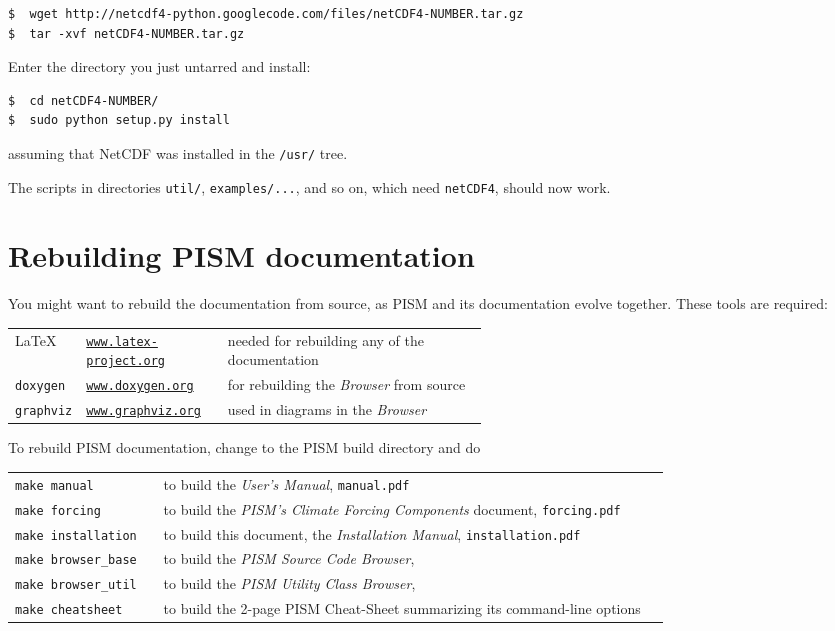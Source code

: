\documentclass[titlepage,letterpaper,final]{scrartcl}
\begin{document}
\begin{verbatim}
$  wget http://netcdf4-python.googlecode.com/files/netCDF4-NUMBER.tar.gz
$  tar -xvf netCDF4-NUMBER.tar.gz
\end{verbatim}
Enter the directory you just untarred and install:
\begin{verbatim}
$  cd netCDF4-NUMBER/
$  sudo python setup.py install
\end{verbatim}
assuming that NetCDF was installed in the \texttt{/usr/} tree.

The scripts in directories \texttt{util/}, \texttt{examples/...}, and so on,
which need \texttt{netCDF4}, should now work.

\section{Rebuilding PISM documentation}
\label{sec:docs}

You might want to rebuild the documentation from source, as PISM and its
documentation evolve together. These tools are required: \bigskip
\begin{center}
  \begin{tabular*}{0.9\linewidth}{llp{0.55\linewidth}}
    \toprule
    \LaTeX & \href{http://www.latex-project.org/}{\texttt{www.latex-project.org}} &  needed for rebuilding any of the documentation \\
    \texttt{doxygen}\index{doxygen} & \href{http://www.stack.nl/~dimitri/doxygen/}{\texttt{www.doxygen.org}} &  for rebuilding the \emph{Browser} from source  \\
    \texttt{graphviz}\index{graphviz} & \href{http://www.graphviz.org/}{\texttt{www.graphviz.org}} &  used in diagrams in the \emph{Browser}  \\
    \bottomrule
  \end{tabular*}
\end{center}
\bigskip
\noindent To rebuild PISM documentation, change to the PISM build directory and do
\begin{center}
  \begin{tabular}{p{0.22\linewidth}p{0.75\linewidth}}
    \texttt{make manual} & to build the \emph{User's Manual}, \texttt{manual.pdf}\\
    \texttt{make forcing} & to build the \emph{PISM's Climate Forcing
      Components} document, \texttt{forcing.pdf} \\
    \texttt{make installation} & to build this document, the \emph{Installation Manual}, \texttt{installation.pdf}\\
    \texttt{make browser_base} & to build the \emph{PISM Source Code Browser},\\
    \texttt{make browser_util} & to build the \emph{PISM Utility Class Browser},\\
    \texttt{make cheatsheet} & to build the 2-page PISM Cheat-Sheet summarizing its command-line options\\
  \end{tabular}
\end{center}
\end{document}
